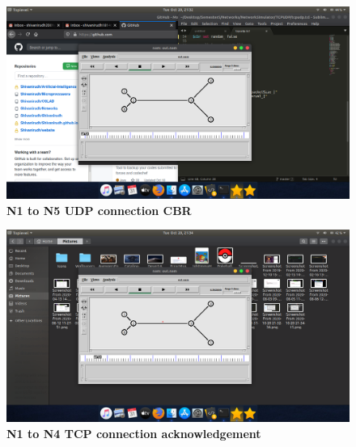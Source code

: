 \documentclass[12pt,letterpaper]{article}
\begin{document}
\begin{flushleft}
\begin{figure}[t]
    \includegraphics[trim = 100mm 50mm 135mm 70mm, clip, width = \textwidth]{Pics/NodeGraph.png}
    \caption{\textbf{N1 to N5 UDP connection CBR}}
\end{figure}
\begin{figure}[t]
	\centering
    \includegraphics[trim = 100mm 50mm 135mm 70mm, clip, width = \textwidth]{Pics/TCPAck.png}
    \caption{\textbf{N1 to N4 TCP connection acknowledgement}}


\end{figure}
\end{flushleft}
\end{document}
